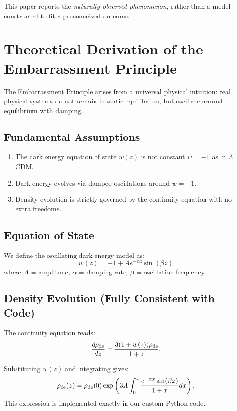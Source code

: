 \documentclass[10pt,a4paper,twocolumn]{article}
\begin{document}
This paper reports the \emph{naturally observed phenomenon}, rather than a model constructed to fit a preconceived outcome.

\section{Theoretical Derivation of the Embarrassment Principle}
The Embarrassment Principle arises from a universal physical intuition: real physical systems do not remain in static equilibrium, but oscillate around equilibrium with damping.

\subsection{Fundamental Assumptions}
\begin{enumerate}
    \item The dark energy equation of state $w(z)$ is not constant $w=-1$ as in $\Lambda$CDM.
    \item Dark energy evolves via damped oscillations around $w=-1$.
    \item Density evolution is strictly governed by the continuity equation with no extra freedoms.
\end{enumerate}

\subsection{Equation of State}
We define the oscillating dark energy model as:
\begin{equation}
w(z) = -1 + A e^{-\alpha z}\sin(\beta z)
\end{equation}
where $A$ = amplitude, $\alpha$ = damping rate, $\beta$ = oscillation frequency.

\subsection{Density Evolution (Fully Consistent with Code)}
The continuity equation reads:
\begin{equation}
\frac{d\rho_{\rm de}}{dz} = \frac{3(1+w(z))\rho_{\rm de}}{1+z}.
\end{equation}

Substituting $w(z)$ and integrating gives:
\begin{equation}
\rho_{\rm de}(z) = \rho_{\rm de}(0)\exp\left(3A\int_0^z \frac{e^{-\alpha x}\sin(\beta x)}{1+x}dx\right).
\end{equation}
This expression is implemented exactly in our custom Python code.
\end{document}
